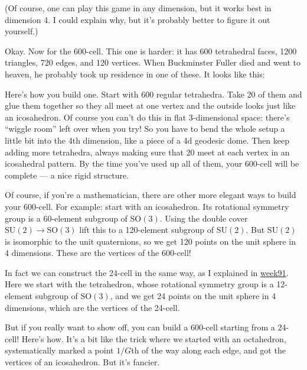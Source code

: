 \documentclass{article}
\def\tightlist{}
\renewcommand{\texttt}[1]{%
  \begingroup
  \ttfamily
  \begingroup\lccode`~=`/\lowercase{\endgroup\def~}{/\discretionary{}{}{}}%
  \begingroup\lccode`~=`[\lowercase{\endgroup\def~}{[\discretionary{}{}{}}%
  \begingroup\lccode`~=`.\lowercase{\endgroup\def~}{.\discretionary{}{}{}}%
  \catcode`/=\active\catcode`[=\active\catcode`.=\active
  \scantokens{#1\noexpand}%
  \endgroup
}
\begin{document}
(Of course, one can play this game in any dimension, but it works best
in dimension 4. I could explain why, but it's probably better to figure
it out yourself.)

Okay. Now for the 600-cell. This one is harder: it has 600 tetrahedral
faces, 1200 triangles, 720 edges, and 120 vertices. When Buckminster
Fuller died and went to heaven, he probably took up residence in one of
these. It looks like this:


Here's how you build one. Start with 600 regular tetrahedra. Take 20 of
them and glue them together so they all meet at one vertex and the
outside looks just like an icosahedron. Of course you can't do this in
flat 3-dimensional space: there's ``wiggle room'' left over when you
try! So you have to bend the whole setup a little bit into the 4th
dimension, like a piece of a 4d geodesic dome. Then keep adding more
tetrahedra, always making sure that 20 meet at each vertex in an
icosahedral pattern. By the time you've used up all of them, your
600-cell will be complete --- a nice rigid structure.

Of course, if you're a mathematician, there are other more elegant ways
to build your 600-cell. For example: start with an icosahedron. Its
rotational symmetry group is a 60-element subgroup of
\(\mathrm{SO}(3)\). Using the double cover
\(\mathrm{SU}(2) \to \mathrm{SO}(3)\) lift this to a 120-element
subgroup of \(\mathrm{SU}(2)\). But \(\mathrm{SU}(2)\) is isomorphic to
the unit quaternions, so we get 120 points on the unit sphere in 4
dimensions. These are the vertices of the 600-cell!

In fact we can construct the 24-cell in the same way, as I explained in
\href{week91.html}{week91}. Here we start with the tetrahedron, whose
rotational symmetry group is a 12-element subgroup of
\(\mathrm{SO}(3)\), and we get 24 points on the unit sphere in 4
dimensions, which are the vertices of the 24-cell.

But if you really want to show off, you can build a 600-cell starting
from a 24-cell! Here's how. It's a bit like the trick where we started
with an octahedron, systematically marked a point \(1/G\)th of the way
along each edge, and got the vertices of an icosahedron. But it's
fancier.
\end{document}
